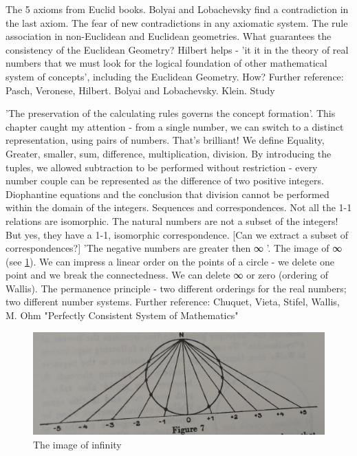 \documentclass{cornell}
\begin{document}
%
{The 5 axioms from Euclid books. Bolyai and Lobachevsky find a contradiction in the last axiom. The fear of new contradictions in any axiomatic system. The rule association in non-Euclidean and Euclidean geometries. What guarantees the consistency of the Euclidean Geometry? Hilbert helps - 'it it in the theory of real numbers that we must look for the logical foundation of other mathematical system of concepts', including the Euclidean Geometry. How?}%
{Further reference: Pasch, Veronese, Hilbert. Bolyai and Lobachevsky. Klein. Study}%

%
{'The preservation of the calculating rules governs the concept formation'. This chapter caught my attention - from a single number, we can switch to a distinct representation, using pairs of numbers. That's brilliant! We define Equality, Greater, smaller, sum, difference, multiplication, division.}%
{By introducing the tuples, we allowed subtraction to be performed without restriction - every number couple can be represented as the difference of two positive integers. Diophantine equations and the conclusion that division cannot be performed within the domain of the integers. Sequences and correspondences. Not all the 1-1 relations are isomorphic. The natural numbers are not a subset of the integers! But yes, they have a 1-1, isomorphic correspondence. [Can we extract a subset of correspondences?]}%
{'The negative numbers are greater then ∞ '. The image of ∞ (see \ref{fig01}). We can impress a linear order on the points of a circle - we delete one point and we break the connectedness. We can delete ∞ or zero (ordering of Wallis). The permanence principle - two different orderings for the real numbers; two different number systems. }%
{Further reference: Chuquet, Vieta, Stifel, Wallis, M. Ohm "Perfectly Consistent System of Mathematics"}%

\begin{figure}[!t]
\centering
\includegraphics[width=1.0\linewidth]{images/fig001.jpg}
\caption{The image of infinity }
\label{fig01}
\end{figure}
\end{document}
